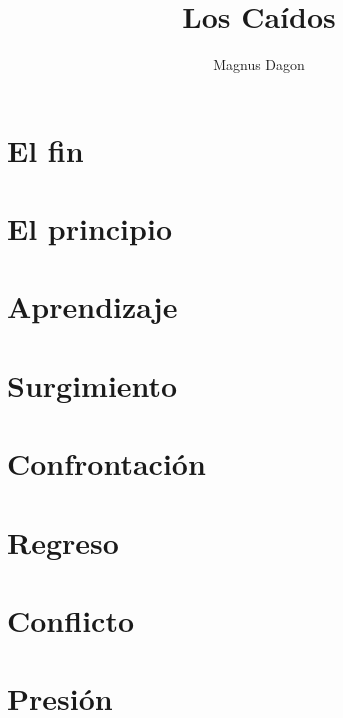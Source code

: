 \documentclass[11pt]{book}
\title{Los Caídos}
\author{Magnus Dagon}
\date{}
\begin{document}


\frontmatter
\maketitle

\thispagestyle{empty}


\tableofcontents

\mainmatter
\chapter{El fin}\label{chapter:el_fin}


\chapter{El principio}\label{chapter:el_principio}


\chapter{Aprendizaje}\label{chapter:aprendizaje}


\chapter{Surgimiento}\label{chapter:surgimiento}


\chapter{Confrontación}\label{chapter:confrontacion}


\chapter{Regreso}\label{chapter:regreso}


\chapter{Conflicto}\label{chapter:conflicto}


\chapter{Presión}\label{chapter:presion}

\end{document}
